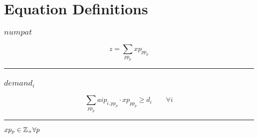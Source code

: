 \documentclass[11pt]{article}
\begin{document}
\section*{Equation Definitions}
\subsubsection*{$numpat$}
\begin{equation*}
z = \sum_{pp_{p}} xp_{pp_{p}}
\end{equation*}
\vspace{5pt}
\hrule
\subsubsection*{$demand_{i}$}
\begin{equation*}
\sum_{pp_{p}} aip_{i,pp_{p}} \cdot xp_{pp_{p}} \geq d_{i}\qquad \forall i
\end{equation*}
\vspace{5pt}
\hrule
\bigskip
$xp_{p}\in \mathbb{Z}_{+} \forall p\\$
\end{document}
